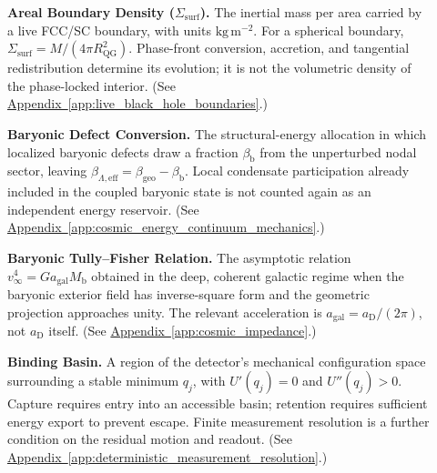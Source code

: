 \begin{description}
\item[] \begin{minipage}[t]{\linewidth}
\textbf{Areal Boundary Density ($\Sigma_{\mathrm{surf}}$).} The inertial mass per area carried by a live FCC/SC boundary, with units $\mathrm{kg\,m^{-2}}$. For a spherical boundary, $\Sigma_{\mathrm{surf}}=M/(4\pi R_{\mathrm{QG}}^2)$. Phase-front conversion, accretion, and tangential redistribution determine its evolution; it is not the volumetric density of the phase-locked interior.
(See \hyperref[app:live_black_hole_boundaries]{Appendix~\ref*{app:live_black_hole_boundaries}}.)
\end{minipage}

\item[] \begin{minipage}[t]{\linewidth}
\textbf{Baryonic Defect Conversion.} The structural-energy allocation in which localized baryonic defects draw a fraction $\beta_{\mathrm b}$ from the unperturbed nodal sector, leaving $\beta_{\Lambda,\mathrm{eff}}=\beta_{\mathrm{geo}}-\beta_{\mathrm b}$. Local condensate participation already included in the coupled baryonic state is not counted again as an independent energy reservoir.
(See \hyperref[app:cosmic_energy_continuum_mechanics]{Appendix~\ref*{app:cosmic_energy_continuum_mechanics}}.)
\end{minipage}

\item[] \begin{minipage}[t]{\linewidth}
\textbf{Baryonic Tully--Fisher Relation.} The asymptotic relation $v_\infty^4=G a_{\mathrm{gal}}M_{\mathrm b}$ obtained in the deep, coherent galactic regime when the baryonic exterior field has inverse-square form and the geometric projection approaches unity. The relevant acceleration is $a_{\mathrm{gal}}=a_{\mathrm D}/(2\pi)$, not $a_{\mathrm D}$ itself.
(See \hyperref[app:cosmic_impedance]{Appendix~\ref*{app:cosmic_impedance}}.)
\end{minipage}

\item[] \begin{minipage}[t]{\linewidth}
\textbf{Binding Basin.} A region of the detector's mechanical configuration space surrounding a stable minimum $q_j$, with $U'(q_j)=0$ and $U''(q_j)>0$. Capture requires entry into an accessible basin; retention requires sufficient energy export to prevent escape. Finite measurement resolution is a further condition on the residual motion and readout.
(See \hyperref[app:deterministic_measurement_resolution]{Appendix~\ref*{app:deterministic_measurement_resolution}}.)
\end{minipage}


\end{description}
